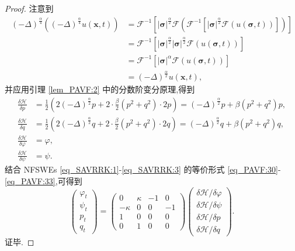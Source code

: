 \begin{proof}
注意到
\begin{align}\label{eq_PAVF:12071}
(-\Delta)^{\frac{\alpha}{4}}((-\Delta)^{\frac{\alpha}{4}}  u(\boldsymbol{x},t))&=\mathcal{F}^{-1}\left[|\boldsymbol{\sigma}|^{\frac{\alpha}{2}} \mathcal{F}(\mathcal{F}^{-1}\left[|\boldsymbol{\sigma}|^{\frac{\alpha}{2}} \mathcal{F}(u(\boldsymbol{\sigma},t))\right])\right]\nonumber\\
&=\mathcal{F}^{-1}\left[|\boldsymbol{\sigma}|^{\frac{\alpha}{2}} |\boldsymbol{\sigma}|^{\frac{\alpha}{2}} \mathcal{F}(u(\boldsymbol{\sigma},t))\right]\nonumber\\
&=\mathcal{F}^{-1}\left[|\boldsymbol{\sigma}|^{\alpha} \mathcal{F}(u(\boldsymbol{\sigma},t))\right]\nonumber\\
&=(-\Delta)^{\frac{\alpha}{2}} u(\boldsymbol{x},t),
\end{align}
并应用引理 \ref{lem_PAVF:2} 中的分数阶变分原理,得到
\begin{align}
\frac{\delta \mathcal{H}}{\delta p} &=\frac{1}{2}\left(2(-\Delta)^{\frac{\alpha}{2}} p+2 \cdot \frac{\beta}{2}\left(p^{2}+q^{2}\right) \cdot 2 p\right)=(-\Delta)^{\frac{\alpha}{2}}p+\beta\left(p^{2}+q^{2}\right) p,\label{eq_PAVF:38a}\\
\frac{\delta \mathcal{H}}{\delta q} &=\frac{1}{2}\left(2(-\Delta)^{\frac{\alpha}{2}} q+2 \cdot \frac{\beta}{2}\left(p^{2}+q^{2}\right) \cdot 2 q\right)=(-\Delta)^{\frac{\alpha}{2}}q+\beta\left(p^{2}+q^{2}\right) q,\label{eq_PAVF:38b}\\
\frac{\delta \mathcal{H}}{\delta \varphi} &=\varphi,\label{eq_PAVF:38c}\\
\frac{\delta \mathcal{H}}{\delta \psi} &=\psi.\label{eq_PAVF:38}
\end{align}
结合 NFSWEs \eqref{eq_SAVRRK:1}-\eqref{eq_SAVRRK:3} 的等价形式 \eqref{eq_PAVF:30}-\eqref{eq_PAVF:33},可得到
\begin{equation}\label{eq_PAVF:39}
\left(\begin{array}{l}
		\varphi_{t} \\
		\psi_{t} \\
		p_{t} \\
		q_{t}
\end{array}\right)
=\left(\begin{array}{cccc}
			0 & \kappa & -1 & 0 \\
			-\kappa & 0 & 0 & -1 \\
			1 & 0 & 0 & 0 \\
			0 & 1 & 0 & 0
\end{array}\right)
\left(\begin{array}{l}
		\delta \mathcal{H} / \delta \varphi \\
		\delta \mathcal{H} / \delta \psi \\
		\delta \mathcal{H} / \delta p \\
		\delta \mathcal{H} / \delta q
\end{array}\right).
\end{equation}
证毕.
\end{proof}

